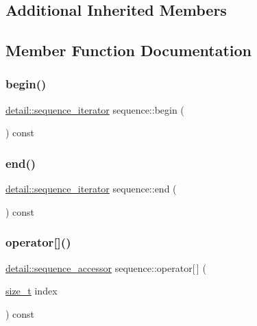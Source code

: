 \subsection*{Additional Inherited Members}


\subsection{Member Function Documentation}
\mbox{\label{classsequence_a6ee816a2ebf7527e19fa141d685c701b}} 
\subsubsection{\texorpdfstring{begin()}{begin()}}
{\footnotesize\ttfamily \mbox{\hyperlink{pytypes_8h_ab0cb36845bb4ad0fcdbc49fbc78bc765}{detail\+::sequence\+\_\+iterator}} sequence\+::begin (\begin{DoxyParamCaption}{ }\end{DoxyParamCaption}) const\hspace{0.3cm}{\ttfamily [inline]}}

\mbox{\label{classsequence_ab2111257eac7ea5438d4ba0bc74914a8}} 
\subsubsection{\texorpdfstring{end()}{end()}}
{\footnotesize\ttfamily \mbox{\hyperlink{pytypes_8h_ab0cb36845bb4ad0fcdbc49fbc78bc765}{detail\+::sequence\+\_\+iterator}} sequence\+::end (\begin{DoxyParamCaption}{ }\end{DoxyParamCaption}) const\hspace{0.3cm}{\ttfamily [inline]}}

\mbox{\label{classsequence_a81ac692e1c3c30d1b1e20a2adb74e584}} 
\subsubsection{\texorpdfstring{operator[]()}{operator[]()}\hspace{0.1cm}{\footnotesize\ttfamily [1/2]}}
{\footnotesize\ttfamily \mbox{\hyperlink{pytypes_8h_afb835b9074801782e0f25a6d78d1d450}{detail\+::sequence\+\_\+accessor}} sequence\+::operator\mbox{[}$\,$\mbox{]} (\begin{DoxyParamCaption}\item[{\mbox{\hyperlink{detail_2common_8h_a801d6a451a01953ef8cbae6feb6a3638}{size\+\_\+t}}}]{index }\end{DoxyParamCaption}) const\hspace{0.3cm}{\ttfamily [inline]}}

